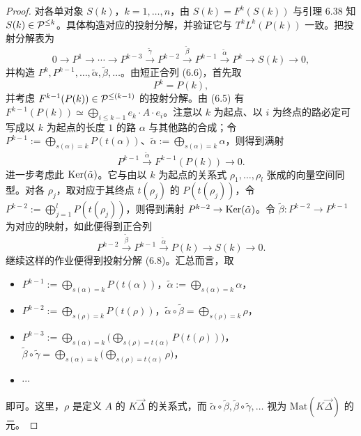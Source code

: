 \begin{proof}
对各单对象 $S(k)$，$k=1,\dots,n$，由 $S(k)=F^{k}(S(k))$ 与引理 6.38 知 $S(k)\in\mathcal{P}^{\le k}$。具体构造对应的投射分解，并验证它与 $T^{k}L^{k}(P(k))$ 一致。把投射分解表为
\begin{equation}
0\to P^{1}\to\cdots\to P^{k-3}\xrightarrow{\tilde\gamma}P^{k-2}\xrightarrow{\tilde\beta}P^{k-1}\xrightarrow{\tilde\alpha}P^{k}\to S(k)\to 0, \tag{6.8}
\end{equation}
并构造 $P^{k},P^{k-1},\dots,\tilde\alpha,\tilde\beta,\dots$。由短正合列 (6.6)，首先取
\[
P^{k}=P(k),
\]
并考虑 $F^{k-1}(P(k))\in\mathcal{P}^{\le(k-1)}$ 的投射分解。由 (6.5) 有 $F^{k-1}(P(k))\simeq\bigoplus_{i\le k-1}e_k\cdot A\cdot e_i$。注意以 $k$ 为起点、以 $i$ 为终点的路必定可写成以 $k$ 为起点的长度 $1$ 的路 $\alpha$ 与其他路的合成；令 $P^{k-1}:=\bigoplus_{s(\alpha)=k}P(t(\alpha))$、$\tilde\alpha:=\bigoplus_{s(\alpha)=k}\alpha$，则得到满射
\[
P^{k-1}\xrightarrow{\tilde\alpha}F^{k-1}(P(k))\to 0.
\]
进一步考虑此 $\operatorname{Ker}(\tilde\alpha)$。它与由以 $k$ 为起点的关系式 $\rho_1,\dots,\rho_l$ 张成的向量空间同型。对各 $\rho_j$，取对应于其终点 $t(\rho_j)$ 的 $P(t(\rho_j))$，令 $P^{k-2}:=\bigoplus_{j=1}^{l}P(t(\rho_j))$，则得到满射 $P^{k-2}\to\operatorname{Ker}(\tilde\alpha)$。令 $\tilde\beta\colon P^{k-2}\to P^{k-1}$ 为对应的映射，如此便得到正合列
\[
P^{k-2}\xrightarrow{\tilde\beta}P^{k-1}\xrightarrow{\tilde\alpha}P(k)\to S(k)\to 0.
\]
继续这样的作业便得到投射分解 (6.8)。汇总而言，取
\begin{itemize}[leftmargin=1.6em,itemsep=1pt,topsep=2pt]
\item $P^{k-1}:=\bigoplus_{s(\alpha)=k}P(t(\alpha))$，$\tilde\alpha:=\bigoplus_{s(\alpha)=k}\alpha$，
\item $P^{k-2}:=\bigoplus_{s(\rho)=k}P(t(\rho))$，$\tilde\alpha\circ\tilde\beta=\bigoplus_{s(\rho)=k}\rho$，
\item $P^{k-3}:=\bigoplus_{s(\alpha)=k}\bigl(\bigoplus_{s(\rho)=t(\alpha)}P(t(\rho))\bigr)$，$\tilde\beta\circ\tilde\gamma=\bigoplus_{s(\alpha)=k}\bigl(\bigoplus_{s(\rho)=t(\alpha)}\rho\bigr)$，
\item $\cdots$
\end{itemize}
即可。这里，$\rho$ 是定义 $A$ 的 $K\vec{\Delta}$ 的关系式，而 $\tilde\alpha\circ\tilde\beta,\tilde\beta\circ\tilde\gamma,\dots$ 视为 $\mathrm{Mat}(K\vec{\Delta})$ 的元。



\end{proof}
